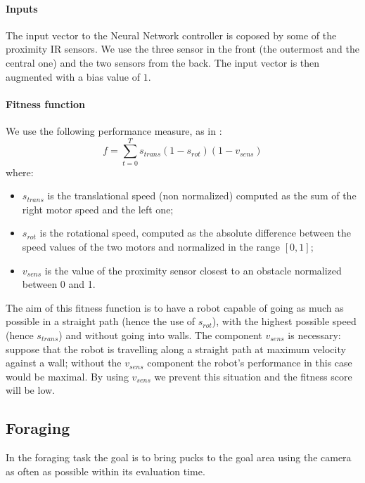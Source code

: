 \documentclass{article}
\begin{document}
	\paragraph{Inputs} %
	\label{par:obstacle_inputs}
	The input vector to the Neural Network controller is coposed by some of the
	proximity IR sensors. We use the three sensor in the front (the outermost 
	and the central one) and the two sensors from the back. The input vector 
	is then augmented with a bias value of $1$.

	\paragraph{Fitness function} %
	\label{par:obstacle_fitness}
	We use the following performance measure, as in \cite{heinermanevolution}:
	$$f = \sum_{t=0}^{T}{s_{trans} (1 - s_{rot}) (1 - v_{sens})}$$
	where:
	\begin{itemize}
		\item $s_{trans}$ is the translational speed (non normalized)
			computed as the sum of the right motor speed and the left one;
		\item $s_{rot}$ is the rotational speed, computed as the absolute
			difference between the speed values of the two motors and normalized
			in the range $[0, 1]$;
		\item $v_{sens}$ is the value of the proximity sensor closest to an
			obstacle normalized between 0 and 1.
	\end{itemize}
	The aim of this fitness function is to have a robot capable of going as much
	as possible in a straight path (hence the use of $s_{rot}$), with the
	highest possible speed (hence $s_{trans}$) and without going into walls. The
	component $v_{sens}$ is necessary: suppose that the robot is travelling
	along a straight path at maximum velocity against a wall; without the
	$v_{sens}$ component the robot's performance in this case would be maximal.
	By using $v_{sens}$ we prevent this situation and the fitness score will be
	low.

	\subsection{Foraging} %
	\label{sub:Foraging}
	In the foraging task the goal is to bring pucks to the goal area using the
	camera as often as possible within its evaluation time.
\end{document}

